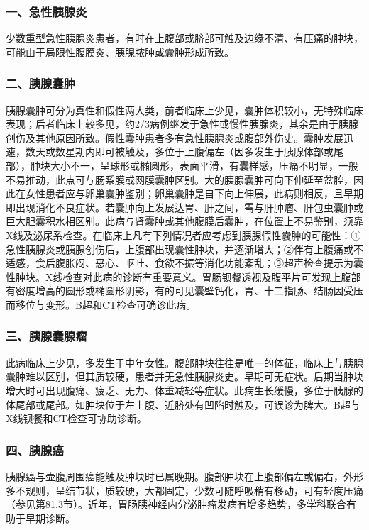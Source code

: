 \subsubsection{一、急性胰腺炎}

少数重型急性胰腺炎患者，有时在上腹部或脐部可触及边缘不清、有压痛的肿块，可能由于局限性腹膜炎、胰腺脓肿或囊肿形成所致。

\subsubsection{二、胰腺囊肿}

胰腺囊肿可分为真性和假性两大类，前者临床上少见，囊肿体积较小，无特殊临床表现；后者临床上较多见，约2/3病例继发于急性或慢性胰腺炎，其余是由于胰腺创伤及其他原因所致。假性囊肿患者多有急性胰腺炎或腹部外伤史。囊肿发展迅速，数天或数星期内即可被触及，多位于上腹偏左（因多发生于胰腺体部或尾部），肿块大小不一，呈球形或椭圆形，表面平滑，有囊样感，压痛不明显，一般不易推动，此点可与肠系膜或网膜囊肿区别。大的胰腺囊肿可向下伸延至盆腔，因此在女性患者应与卵巢囊肿鉴别；卵巢囊肿是自下向上伸展，此病则相反，且早期即出现消化不良症状。若囊肿向上发展达胃、肝之间，需与肝肿瘤、肝包虫囊肿或巨大胆囊积水相区别。此病与肾囊肿或其他腹膜后囊肿，在位置上不易鉴别，须靠X线及泌尿系检查。在临床上凡有下列情况者应考虑到胰腺假性囊肿的可能性：①急性胰腺炎或胰腺创伤后，上腹部出现囊性肿块，并逐渐增大；②伴有上腹痛或不适感，食后腹胀闷、恶心、呕吐、食欲不振等消化功能紊乱；③超声检查提示为囊性肿块。X线检查对此病的诊断有重要意义。胃肠钡餐透视及腹平片可发现上腹部有密度增高的圆形或椭圆形阴影，有的可见囊壁钙化，胃、十二指肠、结肠因受压而移位与变形。B超和CT检查可确诊此病。

\subsubsection{三、胰腺囊腺瘤}

此病临床上少见，多发生于中年女性。腹部肿块往往是唯一的体征，临床上与胰腺囊肿难以区别，但其质较硬，患者并无急性胰腺炎史。早期可无症状。后期当肿块增大时可出现腹痛、疲乏、无力、体重减轻等症状。此病生长缓慢，多位于胰腺的体尾部或尾部。如肿块位于左上腹、近脐处有凹陷时触及，可误诊为脾大。B超与X线钡餐和CT检查可协助诊断。

\subsubsection{四、胰腺癌}

胰腺癌与壶腹周围癌能触及肿块时已属晚期。腹部肿块在上腹部偏左或偏右，外形多不规则，呈结节状，质较硬，大都固定，少数可随呼吸稍有移动，可有轻度压痛（参见第81.3节）。近年，胃肠胰神经内分泌肿瘤发病有增多趋势，多学科联合有助于早期诊断。

